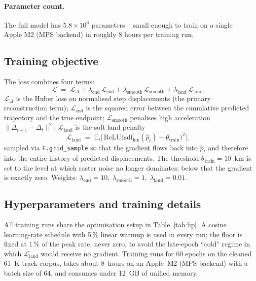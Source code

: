 \documentclass[11pt,a4paper]{article}
\newcommand{\code}[1]{\texttt{\small #1}}
\begin{document}
\paragraph{Parameter count.}
The full model has $5.8 \times 10^6$ parameters -- small enough to train
on a single Apple M2 (MPS backend) in roughly 8 hours per training run.

\subsection{Training objective}\label{sec:loss}

The loss combines four terms:
\begin{equation}\label{eq:loss}
  \mathcal{L} \;=\; \mathcal{L}_{\Delta}
    + \lambda_{\mathrm{end}}\,\mathcal{L}_{\mathrm{end}}
    + \lambda_{\mathrm{smooth}}\,\mathcal{L}_{\mathrm{smooth}}
    + \lambda_{\mathrm{land}}\,\mathcal{L}_{\mathrm{land}}.
\end{equation}
$\mathcal{L}_{\Delta}$ is the Huber loss on normalised step
displacements (the primary reconstruction term);
$\mathcal{L}_{\mathrm{end}}$ is the squared error between the cumulative
predicted trajectory and the true endpoint;
$\mathcal{L}_{\mathrm{smooth}}$ penalises high acceleration
$\| \Delta_{t+1} - \Delta_t\|^2$;
$\mathcal{L}_{\mathrm{land}}$ is the soft land penalty
\[
  \mathcal{L}_{\mathrm{land}}
   \;=\; \mathbb{E}_t\bigl[\,
     \mathrm{ReLU}\bigl(\mathrm{sdf}_{\mathrm{km}}(\hat p_t)
                        - \theta_{\mathrm{train}}\bigr)^2 \bigr],
\]
sampled via \code{F.grid\_sample} so that the gradient flows back into
$\hat p_t$ and therefore into the entire history of predicted
displacements.  The threshold $\theta_{\mathrm{train}} = 10$~km is set
to the level at which raster noise no longer dominates; below that the
gradient is exactly zero.  Weights:
$\lambda_{\mathrm{end}} = 10,\;
 \lambda_{\mathrm{smooth}} = 1,\;
 \lambda_{\mathrm{land}} = 0.01$.

\subsection{Hyperparameters and training details}\label{sec:hp}

All training runs share the optimisation setup in
Table~\ref{tab:hp}.  A cosine learning-rate schedule with 5\,\% linear
warmup is used in every run; the floor is fixed at 1\,\% of the peak
rate, never zero, to avoid the late-epoch ``cold'' regime in which
$\mathcal{L}_{\mathrm{land}}$ would receive no gradient.
Training runs for 60 epochs on the cleaned 61~K-track corpus, takes
about 8~hours on an Apple~M2 (MPS backend) with a batch size of 64,
and consumes under 12~GB of unified memory.
\end{document}
